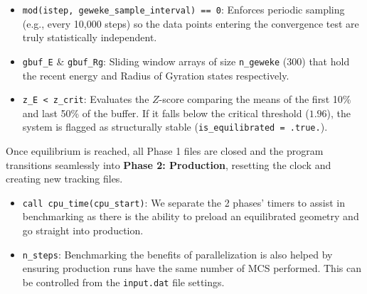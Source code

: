 \begin{itemize}
\tightlist
\item
  \texttt{mod(istep,\ geweke\_sample\_interval)\ ==\ 0}: Enforces
  periodic sampling (e.g., every 10,000 steps) so the data points
  entering the convergence test are truly statistically independent.
\item
  \texttt{gbuf\_E} \& \texttt{gbuf\_Rg}: Sliding window arrays of size
  \texttt{n\_geweke} (300) that hold the recent energy and Radius of
  Gyration states respectively.
\item
  \texttt{z\_E\ \textless{}\ z\_crit}: Evaluates the \(Z\)-score
  comparing the means of the first 10\% and last 50\% of the buffer. If
  it falls below the critical threshold (\(1.96\)), the system is
  flagged as structurally stable (\texttt{is\_equilibrated\ =\ .true.}).
\end{itemize}

Once equilibrium is reached, all Phase 1 files are closed and the
program transitions seamlessly into \textbf{Phase 2: Production},
resetting the clock and creating new tracking files.

\begin{Shaded}
\begin{Highlighting}[]
  \CommentTok{! ======================================================}
  \CommentTok{! ======================================================}
  
  \KeywordTok{=} 

    \KeywordTok{\&}
\end{Highlighting}
\end{Shaded}

\begin{itemize}
\tightlist
\item
  \texttt{call\ cpu\_time(cpu\_start)}: We separate the 2 phases' timers
  to assist in benchmarking as there is the ability to preload an
  equilibrated geometry and go straight into production.
\item
  \texttt{n\_steps}: Benchmarking the benefits of parallelization is
  also helped by ensuring production runs have the same number of MCS
  performed. This can be controlled from the \texttt{input.dat} file
  settings.
\end{itemize}

